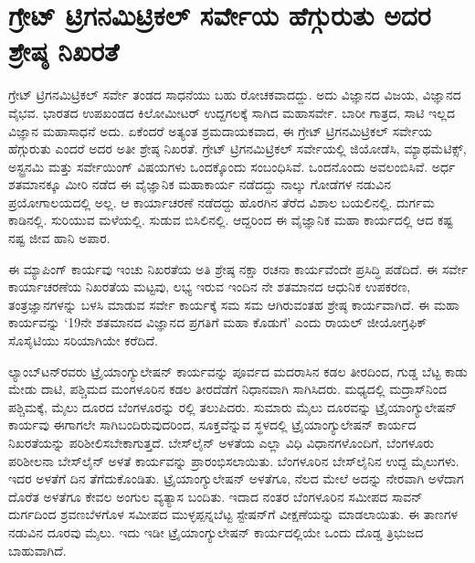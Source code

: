 
\chapter{ಗ್ರೇಟ್​ ಟ್ರಿಗನಮಿಟ್ರಿಕಲ್​ ಸರ್ವೇಯ ಹೆಗ್ಗುರುತು ಅದರ ಶ್ರೇಷ್ಠ ನಿಖರತೆ}

\vskip -8pt

ಗ್ರೇಟ್​ ಟ್ರಿಗನಮಿಟ್ರಿಕಲ್​ ಸರ್ವೇ ತಂಡದ ಸಾಧನೆಯು ಬಹು ರೋಚಕವಾದದ್ದು. ಅದು ವಿಜ್ಞಾನದ ವಿಜಯ, ವಿಜ್ಞಾನದ ವೈಭವ. ಭಾರತದ ಉಪಖಂಡದ  ಕಿಲೋಮೀಟರ್​ ಉದ್ದಗಲಕ್ಕೆ ಸಾಗಿದ ಮಹಾಸರ್ವೇ. ಬಾರೀ ಗಾತ್ರದ, ಸಾಟಿ ಇಲ್ಲದ ವಿಜ್ಞಾನ ಮಹಾಸಾಧನೆ ಅದು. ಏಕೆಂದರೆ ಅತ್ಯಂತ ಶ್ರಮದಾಯಕವಾದ, ಈ ಗ್ರೇಟ್​ ಟ್ರಿಗನಮಿಟ್ರಿಕಲ್​ ಸರ್ವೇಯ ಹೆಗ್ಗುರುತು ಎಂದರೆ ಅದರ ಅತೀ ಶ್ರೇಷ್ಠ ನಿಖರತೆ. ಗ್ರೇಟ್​ ಟ್ರಿಗನಮಿಟ್ರಿಕಲ್​ ಸರ್ವೇಯಲ್ಲಿ ಜಿಯೋಡೆಸಿ, ಮ್ಯಾಥಮೆಟಿಕ್ಸ್​, ಅಸ್ಟ್ರನಮಿ ಮತ್ತು ಸರ್ವೇಯಿಂಗ್​ ವಿಷಯಗಳು ಒಂದಕ್ಕೊಂದು ಸಂಬಂಧಿಸಿವೆ. ಒಂದನೊಂದು ಅವಲಂಬಿಸಿವೆ. ಅರ್ಧ ಶತಮಾನಕ್ಕೂ ಮೀರಿ ನಡೆದ ಈ ವೈಜ್ಞಾನಿಕ ಮಹಾಕಾರ್ಯ ನಡೆದದ್ದು ನಾಲ್ಕು ಗೋಡೆಗಳ ನಡುವಿನ ಪ್ರಯೋಗಾಲಯದಲ್ಲಿ ಅಲ್ಲ. ಆ ಕಾರ್ಯಾಚರಣೆ ನಡೆದದ್ದು ಹೊರಗಿನ ತೆರೆದ ವಿಶಾಲ ಬಯಲಿನಲ್ಲಿ. ದುರ್ಗಮ ಕಾಡಿನಲ್ಲಿ. ಸುರಿಯುವ ಮಳೆಯಲ್ಲಿ. ಸುಡುವ ಬಿಸಿಲಿನಲ್ಲಿ. ಆದ್ದರಿಂದ ಈ ವೈಜ್ಞಾನಿಕ ಮಹಾ ಕಾರ್ಯದಲ್ಲಿ ಆದ ಕಷ್ಟ ನಷ್ಟ ಜೀವ ಹಾನಿ ಅಪಾರ.

ಈ ಮ್ಯಾಪಿಂಗ್​ ಕಾರ್ಯವು ಇಂಚು ನಿಖರತೆಯ ಅತಿ ಶ್ರೇಷ್ಠ ನಕ್ಷಾ ರಚನಾ ಕಾರ್ಯವೆಂದೇ ಪ್ರಸಿದ್ಧಿ ಪಡೆದಿದೆ. ಈ ಸರ್ವೇ ಕಾರ್ಯಾಚರಣೆಯ ನಿಖರತೆಯ ಮಟ್ಟವು, ಲಭ್ಯ ಇರುವ ಇಂದಿನ ನೇ ಶತಮಾನದ ಆಧುನಿಕ ಉಪಕರಣ, ತಂತ್ರಜ್ಞಾನಗಳನ್ನು ಬಳಸಿ ಮಾಡುವ ಸರ್ವೇ ಕಾರ್ಯಕ್ಕೆ ಸಮ ಸಮ ಆಗಿರುವಂತಹ ಶ್ರೇಷ್ಠ ಕಾರ್ಯವಾಗಿದೆ. ಈ ಮಹಾ ಕಾರ್ಯವನ್ನು ‘19ನೇ ಶತಮಾನದ ವಿಜ್ಞಾನದ ಪ್ರಗತಿಗೆ ಮಹಾ ಕೊಡುಗೆ’ ಎಂದು ರಾಯಲ್​ ಜೀಯೋಗ್ರಫಿಕ್​ ಸೊಸೈಟಿಯು ಸರಿಯಾಗಿಯೇ ಕರೆದಿದೆ.

ಲ್ಯಾಂಬ್​ಟನ್​ರವರು ಟ್ರೈಯಾಂಗ್ಯುಲೇಷನ್​ ಕಾರ್ಯವನ್ನು ಪೂರ್ವದ ಮದರಾಸಿನ ಕಡಲ ತೀರದಿಂದ, ಗುಡ್ಡ ಬೆಟ್ಟ ಕಾಡು ಮೇಡು ದಾಟಿ, ಪಶ್ಚಿಮದ ಮಂಗಳೂರಿನ ಕಡಲ ತೀರದೆಡೆಗೆ ನಿಧಾನವಾಗಿ ಸಾಗಿಸಿದರು. ಮಧ್ಯದಲ್ಲಿ ಮದ್ರಾಸ್​ನಿಂದ ಪಶ್ಚಿಮಕ್ಕೆ,  ಮೈಲು ದೂರದ ಬೆಂಗಳೂರನ್ನು  ರಲ್ಲಿ ತಲುಪಿದರು. ಸುಮಾರು  ಮೈಲು ದೂರವನ್ನು ಟ್ರೈಯಾಂಗ್ಯುಲೇಷನ್​ ಕಾರ್ಯವು ಈಗಾಗಲೇ ಸಾಗಿಬಂದಿರುವುದರಿಂದ, ಸೂಕ್ತವೆನ್ನುವ ಸ್ಥಳದಲ್ಲಿ ಟ್ರೈಯಾಂಗ್ಯುಲೇಷನ್​ ಕಾರ್ಯದ ನಿಖರತೆಯನ್ನು ಪರಿಶೀಲಿಸಬೇಕಾಗುತ್ತದೆ. ಬೇಸ್‌ಲೈನ್​ ಅಳತೆಯ ಎಲ್ಲಾ ವಿಧಿ ವಿಧಾನಗಳೊಂದಿಗೆ, ಬೆಂಗಳೂರು ಪರಿಶೀಲನಾ ಬೇಸ್‌ಲೈನ್​ ಅಳತೆ ಕಾರ್ಯವನ್ನು ಪ್ರಾರಂಭಿಸಲಾಯಿತು. ಬೆಂಗಳೂರಿನ ಬೇಸ್‌ಲೈನಿನ ಉದ್ದ  ಮೈಲುಗಳು. ಇದರ ಅಳತೆಗೆ  ದಿನ ತೆಗೆದುಕೊಂಡಿತು. ಟ್ರೈಯಾಂಗ್ಯುಲೇಷನ್​ ಅಳತೆಗೂ, ನೆಲದ ಮೇಲೆ ಅದನ್ನು ನೇರವಾಗಿ ಅಳೆದಾಗ ದೊರೆತ ಅಳತೆಗೂ ಕೇವಲ  ಅಂಗುಲ ವ್ಯತ್ಯಾಸ ಬಂದಿತು. ಇದಾದ ನಂತರ ಬೆಂಗಳೂರಿನ ಸಮೀಪದ ಸಾವನ್​ ದುರ್ಗದಿಂದ ಶ್ರವಣಬೆಳಗೊಳ ಸಮೀಪದ ಮುಳ್ಳಪ್ಪನ್ನಬೆಟ್ಟ ಸ್ಟೇಷನ್​ಗೆ ವೀಕ್ಷಣೆಯನ್ನು ಮಾಡಲಾಯಿತು. ಈ ತಾಣಗಳ ನಡುವಿನ ದೂರವು  ಮೈಲು. ಇದು ಇಡೀ ಟ್ರೈಯಾಂಗ್ಯುಲೇಷನ್​ ಕಾರ್ಯದಲ್ಲಿಯೇ ಒಂದು ದೊಡ್ಡ ತ್ರಿಭುಜದ ಬಾಹುವಾಗಿದೆ.

\vskip 5pt

